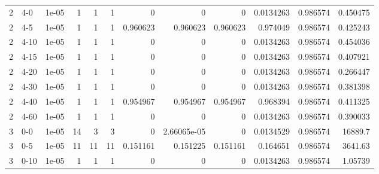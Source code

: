 \begin{tabular}{rlrrrrrrrrrr}
     2 & 4-0    &      1e-05 &           1 &                 1 &                 1 &     0           &     0           &      0           &        0.0134263 &               0.986574 &           0.450475 \\
     2 & 4-5    &      1e-05 &           1 &                 1 &                 1 &     0.960623    &     0.960623    &      0.960623    &        0.974049  &               0.986574 &           0.425243 \\
     2 & 4-10   &      1e-05 &           1 &                 1 &                 1 &     0           &     0           &      0           &        0.0134263 &               0.986574 &           0.454036 \\
     2 & 4-15   &      1e-05 &           1 &                 1 &                 1 &     0           &     0           &      0           &        0.0134263 &               0.986574 &           0.407921 \\
     2 & 4-20   &      1e-05 &           1 &                 1 &                 1 &     0           &     0           &      0           &        0.0134263 &               0.986574 &           0.266447 \\
     2 & 4-30   &      1e-05 &           1 &                 1 &                 1 &     0           &     0           &      0           &        0.0134263 &               0.986574 &           0.381398 \\
     2 & 4-40   &      1e-05 &           1 &                 1 &                 1 &     0.954967    &     0.954967    &      0.954967    &        0.968394  &               0.986574 &           0.411325 \\
     2 & 4-60   &      1e-05 &           1 &                 1 &                 1 &     0           &     0           &      0           &        0.0134263 &               0.986574 &           0.390033 \\
     3 & 0-0    &      1e-05 &          14 &                 3 &                 3 &     0           &     2.66065e-05 &      0           &        0.0134529 &               0.986574 &       16889.7      \\
     3 & 0-5    &      1e-05 &          11 &                11 &                11 &     0.151161    &     0.151225    &      0.151161    &        0.164651  &               0.986574 &        3641.63     \\
     3 & 0-10   &      1e-05 &           1 &                 1 &                 1 &     0           &     0           &      0           &        0.0134263 &               0.986574 &           1.05739  \\

\end{tabular}
